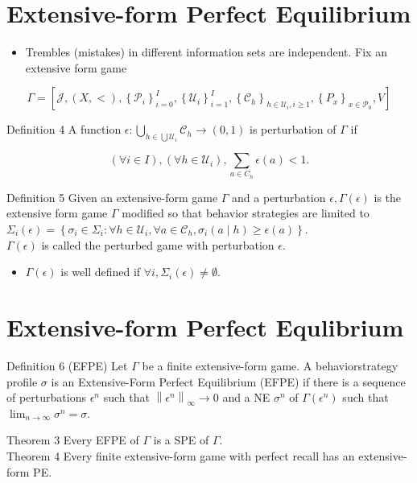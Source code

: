 \documentclass[10pt]{article}
\begin{document}
\section*{Extensive-form Perfect Equilibrium}
\begin{itemize}
  \item Trembles (mistakes) in different information sets are independent. Fix an extensive form game
\end{itemize}

$$
\Gamma=\left[\mathcal{J},(X,<),\left\{\mathcal{P}_{i}\right\}_{i=0}^{I},\left\{\mathcal{U}_{i}\right\}_{i=1}^{I},\left\{\mathcal{C}_{h}\right\}_{h \in \mathcal{U}_{i}, i \geq 1},\left\{P_{x}\right\}_{x \in \mathcal{P}_{0}}, V\right]
$$

Definition 4 A function $\epsilon: \bigcup_{h \in \bigcup \mathcal{U}_{i}} \mathcal{C}_{h} \rightarrow(0,1)$ is perturbation of $\Gamma$ if

$$
(\forall i \in I),\left(\forall h \in \mathcal{U}_{i}\right), \sum_{a \in C_{h}} \epsilon(a)<1 .
$$

Definition 5 Given an extensive-form game $\Gamma$ and a perturbation $\epsilon, \Gamma(\epsilon)$ is the extensive form game $\Gamma$ modified so that behavior strategies are limited to $\Sigma_{i}(\epsilon)=\left\{\sigma_{i} \in \Sigma_{i}: \forall h \in \mathcal{U}_{i}, \forall a \in \mathcal{C}_{h}, \sigma_{i}(a \mid h) \geq \epsilon(a)\right\}$.\\
$\Gamma(\epsilon)$ is called the perturbed game with perturbation $\epsilon$.

\begin{itemize}
  \item $\Gamma(\epsilon)$ is well defined if $\forall i, \Sigma_{i}(\epsilon) \neq \emptyset$.
\end{itemize}

\section*{Extensive-form Perfect Equlibrium}
Definition 6 (EFPE) Let $\Gamma$ be a finite extensive-form game. A behaviorstrategy profile $\sigma$ is an Extensive-Form Perfect Equilibrium (EFPE) if there is a sequence of perturbations $\epsilon^{n}$ such that $\left\|\epsilon^{n}\right\|_{\infty} \rightarrow 0$ and a NE $\sigma^{n}$ of $\Gamma\left(\epsilon^{n}\right)$ such that $\lim _{n \rightarrow \infty} \sigma^{n}=\sigma$.

Theorem 3 Every EFPE of $\Gamma$ is a SPE of $\Gamma$.\\
Theorem 4 Every finite extensive-form game with perfect recall has an extensive-form PE.
\end{document}
